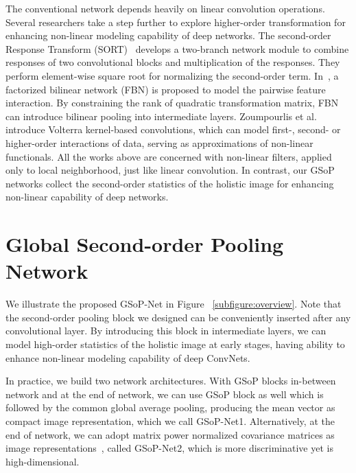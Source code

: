 \documentclass[10pt,twocolumn,letterpaper]{article}
\begin{document}
The conventional network depends heavily  on linear convolution operations. Several researchers take a step further to explore higher-order transformation  for enhancing non-linear modeling  capability of deep networks. The second-order Response Transform (SORT)~\cite{Wang_2017_ICCV} develops a two-branch network module to combine responses of two  convolutional blocks and  multiplication of the responses. They perform element-wise square root for normalizing the second-order term. 
In~\cite{LiYanghao_2017_ICCV}, a factorized bilinear network (FBN) is proposed to model the pairwise feature interaction. By constraining  the rank of quadratic transformation  matrix, FBN can introduce bilinear  pooling into intermediate  layers.  Zoumpourlis et al.~\cite{Zoumpourlis_2017_ICCV} introduce Volterra kernel-based convolutions, which can model first-, second- or higher-order interactions of data, serving as approximations of non-linear functionals. All the  works above are concerned with non-linear filters, applied only to local neighborhood, just  like linear convolution. In contrast, our GSoP networks collect  the second-order statistics of the holistic image for enhancing  non-linear capability  of deep networks.  


  

\section{Global Second-order Pooling Network}\label{section:proposed}


We illustrate the proposed GSoP-Net in Figure  ~\ref{subfigure:overview}.  Note that  the  second-order pooling block we designed  can be conveniently  inserted after any convolutional layer. By introducing this block in intermediate  layers, we can model high-order statistics of the holistic image at early stages, having ability to enhance  non-linear modeling capability of deep ConvNets.


In practice, we build two network architectures. With GSoP blocks in-between network and at the end of network, we can use GSoP block as well which is followed by the common global average pooling, producing the mean vector as compact image representation, which  we call  GSoP-Net1. Alternatively, at the end of network, we can adopt matrix power normalized covariance matrices as image representations~\cite{Li_2017_ICCV}, called GSoP-Net2, which is more discriminative yet is high-dimensional. 
\end{document}
